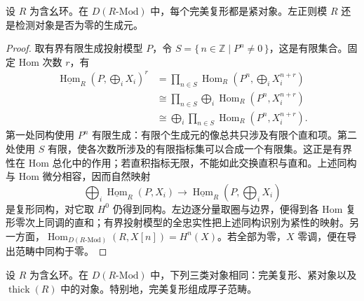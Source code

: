 \begin{proposition}\label{b4:prop:perfect-compact-ring-generator}
	设 \(R\) 为含幺环。在 \(D(R\text{-}\mathrm{Mod})\) 中，每个完美复形都是紧对象。左正则模 \(R\) 还是检测对象是否为零的生成元。
\end{proposition}
\begin{proof}
	取有界有限生成投射模型 \(P\)，令 \(S=\{\,n\in\mathbb Z\mid P^n\ne0\,\}\)，这是有限集合。固定 Hom 次数 \(r\)，有
	\[
		\begin{aligned}
			\underline{\operatorname{Hom}}_R\left(P,\bigoplus_iX_i\right)^r &=\prod_{n\in S}\operatorname{Hom}_R \left(P^n,\bigoplus_iX_i^{n+r}\right)\\
			&\cong\prod_{n\in S}\bigoplus_i\operatorname{Hom}_R(P^n,X_i^{n+r})\\
			&\cong\bigoplus_i\prod_{n\in S}\operatorname{Hom}_R(P^n,X_i^{n+r}).
		\end{aligned}
	\]
	第一处同构使用 \(P^n\) 有限生成：有限个生成元的像总共只涉及有限个直和项。第二处使用 \(S\) 有限，使各次数所涉及的有限指标集可以合成一个有限集。这正是有界性在 Hom 总化中的作用；若直积指标无限，不能如此交换直积与直和。上述同构与 Hom 微分相容，因而自然映射
	\[
		\bigoplus_i\underline{\operatorname{Hom}}_R(P,X_i) \longrightarrow \underline{\operatorname{Hom}}_R\left(P,\bigoplus_iX_i\right)
	\]
	是复形同构，对它取 \(H^0\) 仍得到同构。左边逐分量取圈与边界，便得到各 Hom 复形零次上同调的直和；有界投射模型的全忠实性把上述同构识别为紧性的映射。另一方面，\(\operatorname{Hom}_{D(R\text{-}\mathrm{Mod})}(R,X[n])=H^n(X)\)。若全部为零，\(X\) 零调，便在导出范畴中同构于零。
\end{proof}

\begin{theorem}[完美复形的内在刻画]\label{b4:thm:perfect-compact-thick}
	设 \(R\) 为含幺环。在 \(D(R\text{-}\mathrm{Mod})\) 中，下列三类对象相同：完美复形、紧对象以及 \(\operatorname{thick}(R)\) 中的对象。特别地，完美复形组成厚子范畴。
\end{theorem}

